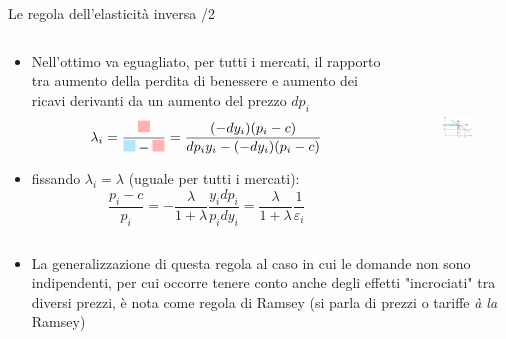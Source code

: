 \documentclass[aspectratio=64,11pt]{beamer}
\begin{document}
\begin{frame}{Le regola dell'elasticità inversa /2}
\begin{columns}
\begin{column}{.57\columnwidth}
\begin{itemize}
\item Nell'ottimo va eguagliato, per tutti i mercati, il rapporto tra aumento della perdita di benessere e aumento dei ricavi derivanti da un aumento del prezzo $dp_i$
\begin{equation*}
  \lambda_i=
  \frac{\textcolor{red!30!white}{\rule{3mm}{3mm}}}{\textcolor{cyan!30!white}{\rule{3mm}{3mm}}-
        \textcolor{red!30!white}{\rule{3mm}{3mm}}}=
  \frac{(-dy_i)(p_i-c)}{dp_iy_i-(-dy_i)(p_i-c)}
\end{equation*}
\item fissando $\lambda_i=\lambda$ (uguale per tutti i mercati):
\begin{equation*}
   \frac{p_i-c}{p_i} = -\frac{\lambda}{1+\lambda}\frac{y_idp_i}{p_idy_i} = \frac{\lambda}{1+\lambda}\frac{1}{\varepsilon_i} 
\end{equation*}
\end{itemize}
\end{column}

\begin{column}{.43\columnwidth}
\begin{figure}[htbp]
\centering
\includegraphics[height=4cm]{./figure/ramsey-4-color.pdf}
\end{figure}
\end{column}
\end{columns}

\medskip
\begin{itemize}
\item La generalizzazione di questa regola al caso in cui le domande non sono
indipendenti, per cui occorre tenere conto anche degli effetti "incrociati" tra diversi prezzi, è nota come \alert{regola di Ramsey} (si parla di prezzi o tariffe \emph{à la} Ramsey)
\end{itemize}
\end{frame}
\end{document}

